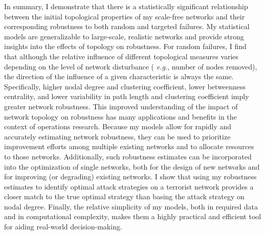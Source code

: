 In summary, I demonstrate that there is a statistically significant relationship between the initial topological properties of my scale-free networks and their corresponding robustness to both random and targeted failures. My statistical models are generalizable to large-scale, realistic networks and provide strong insights into the effects of topology on robustness. For random failures, I find that although the relative influence of different topological measures varies depending on the level of network disturbance ( \emph{e.g.}, number of nodes removed), the direction of the influence of a given characteristic is always the same.  Specifically, higher nodal degree and clustering coefficient, lower betweenness centrality, and lower variability in path length and clustering coefficient imply greater network robustness.  This improved understanding of the impact of network topology on robustness has many applications and benefits in the context of operations research.  Because my models allow for rapidly and accurately estimating network robustness, they can be used to prioritize improvement efforts among multiple existing networks and to allocate resources to those networks. Additionally, such robustness estimates can be incorporated into the optimization of single networks, both for the design of new networks and for improving (or degrading) existing networks.  I show that using my robustness estimates to identify optimal attack strategies on a terrorist network provides a closer match to the true optimal strategy than basing the attack strategy on nodal degree. Finally, the relative simplicity of my models, both in required data and in computational complexity, makes them a highly practical and efficient tool for aiding real-world decision-making.

